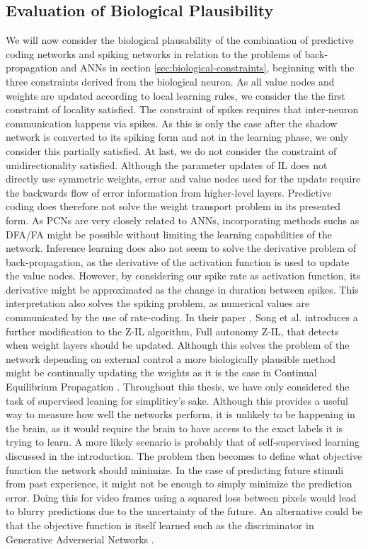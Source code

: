 \documentclass[a4paper,11pt]{article} %
\begin{document}
\newpage

\subsection{Evaluation of Biological Plausibility}
We will now consider the biological plausability of the combination of predictive coding networks and spiking networks in relation to the problems of back-propagation and ANNs in section \ref{sec:biological-constraints}, beginning with the three constraints derived from the biological neuron. As all value nodes and weights are updated according to local learning rules, we consider the the first constraint of locality satisfied. The constraint of spikes requires that inter-neuron communication happens via spikes. As this is only the case after the shadow network is converted to its spiking form and not in the learning phase, we only consider this partially satisfied. At last, we do not consider the constraint of unidirectionality satisfied. Although the parameter updates of IL does not directly use symmetric weights, error and value nodes used for the update require the backwards flow of error information from higher-level layers. Predictive coding does therefore not solve the weight transport problem in its presented form. As PCNs are very closely related to ANNs, incorporating methods suchs as DFA/FA might be possible without limiting the learning capabilities of the network. Inference learning does also not seem to solve the derivative problem of back-propagation, as the derivative of the activation function is used to update the value nodes. However, by considering our spike rate as activation function, its derivative might be approximated as the change in duration between spikes. This interpretation also solves the spiking problem, as numerical values are communicated by the use of rate-coding. In their paper \cite{PredictiveCodingNetworks}, Song et al. introduces a further modification to the Z-IL algorithm, Full autonomy Z-IL, that detects when weight layers should be updated. Although this solves the problem of the network depending on external control a more biologically plausible method might be continually updating the weights as it is the case in Continual Equilibrium Propagation \cite{ContinualEqProp}.  Throughout this thesis, we have only considered the task of supervised leaning for simpliticy's sake. Although this provides a useful way to measure how well the networks perform, it is unlikely to be happening in the brain, as it would require the brain to have access to the exact labels it is trying to learn. A more likely scenario is probably that of self-supervised learning discussed in the introduction. The problem then becomes to define what objective function the network should minimize. In the case of predicting future stimuli from past experience, it might not be enough to simply minimize the prediction error. Doing this for video frames using a squared loss between pixels would lead to blurry predictions due to the uncertainty of the future. An alternative could be that the objective function is itself learned such as the discriminator in Generative Adverserial Networks \cite{goodfellow2014generative}. 
\end{document}
